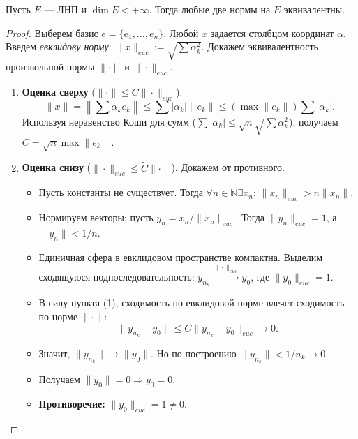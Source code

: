 \begin{proposition}\label{normequiv}
	Пусть $E$ --- ЛНП и $\dim E < +\infty$. Тогда любые две нормы на $E$ эквивалентны.
\end{proposition}



\begin{proof}
	Выберем базис $e = \{e_1, \dots, e_n\}$. Любой $x$ задается столбцом координат $\alpha$.
	Введем \textit{евклидову норму}: $\|x\|_{euc} := \sqrt{\sum \alpha_k^2}$.
	Докажем эквивалентность произвольной нормы $\|\cdot\|$ и $\|\cdot\|_{euc}$.
	
	\begin{enumerate}
		\item \textbf{Оценка сверху} ($\|\cdot\| \leqslant C \|\cdot\|_{euc}$).
		\[ \|x\| = \left\| \sum \alpha_k e_k \right\| \leqslant \sum |\alpha_k| \|e_k\| \leqslant \left(\max \|e_k\|\right) \sum |\alpha_k|. \]
		Используя неравенство Коши для сумм ($\sum |\alpha_k| \leqslant \sqrt{n} \sqrt{\sum \alpha_k^2}$), получаем $C = \sqrt{n} \max \|e_k\|$.
		
		\item \textbf{Оценка снизу} ($\|\cdot\|_{euc} \leqslant \widetilde{C} \|\cdot\|$). Докажем от противного.
		\begin{itemize}
			\item Пусть константы не существует. Тогда $\forall n \in \mathbb{N} \exists x_n$: $\|x_n\|_{euc} > n \|x_n\|$.
			\item Нормируем векторы: пусть $y_n = x_n / \|x_n\|_{euc}$. Тогда $\|y_n\|_{euc} = 1$, а $\|y_n\| < 1/n$.
			\item Единичная сфера в евклидовом пространстве компактна. Выделим сходящуюся подпоследовательность: $y_{n_k} \xrightarrow{\|\cdot\|_{euc}} y_0$, где $\|y_0\|_{euc} = 1$.
			\item В силу пункта (1), сходимость по евклидовой норме влечет сходимость по норме $\|\cdot\|$:
			\[ \|y_{n_k} - y_0\| \leqslant C \|y_{n_k} - y_0\|_{euc} \to 0. \]
			\item Значит, $\|y_{n_k}\| \to \|y_0\|$. Но по построению $\|y_{n_k}\| < 1/n_k \to 0$.
			\item Получаем $\|y_0\| = 0 \Rightarrow y_0 = 0$.
			\item \textbf{Противоречие:} $\|y_0\|_{euc} = 1 \neq 0$.
		\end{itemize}
	\end{enumerate}
\end{proof}

